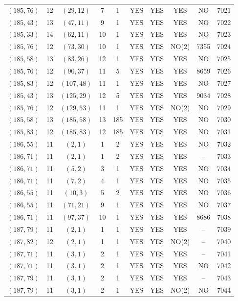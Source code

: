 \begin{longtable}{|c|c|c|c|c|c|c|c|c|c|}
$(185, 76)$ & 12 & $(29, 12)$ & 7 & 1 & YES & YES & YES & NO & 7021\\
$(185, 43)$ & 13 & $(47, 11)$ & 9 & 1 & YES & YES & YES & NO & 7022\\
$(185, 33)$ & 14 & $(62, 11)$ & 10 & 1 & YES & YES & YES & NO & 7023\\
$(185, 76)$ & 12 & $(73, 30)$ & 10 & 1 & YES & YES & NO(2) & 7355 & 7024\\
$(185, 58)$ & 13 & $(83, 26)$ & 12 & 1 & YES & YES & YES & NO & 7025\\
$(185, 76)$ & 12 & $(90, 37)$ & 11 & 5 & YES & YES & YES & 8659 & 7026\\
$(185, 83)$ & 12 & $(107, 48)$ & 11 & 1 & YES & YES & YES & NO & 7027\\
$(185, 43)$ & 13 & $(125, 29)$ & 12 & 5 & YES & YES & YES & 9034 & 7028\\
$(185, 76)$ & 12 & $(129, 53)$ & 11 & 1 & YES & YES & NO(2) & NO & 7029\\
$(185, 58)$ & 13 & $(185, 58)$ & 13 & 185 & YES & YES & YES & NO & 7030\\
$(185, 83)$ & 12 & $(185, 83)$ & 12 & 185 & YES & YES & YES & NO & 7031\\
$(186, 55)$ & 11 & $(2, 1)$ & 1 & 2 & YES & YES & YES & NO & 7032\\
$(186, 71)$ & 11 & $(2, 1)$ & 1 & 2 & YES & YES & YES & -- & 7033\\
$(186, 71)$ & 11 & $(5, 2)$ & 3 & 1 & YES & YES & YES & NO & 7034\\
$(186, 71)$ & 11 & $(7, 2)$ & 4 & 1 & YES & YES & YES & NO & 7035\\
$(186, 55)$ & 11 & $(10, 3)$ & 5 & 2 & YES & YES & YES & NO & 7036\\
$(186, 55)$ & 11 & $(71, 21)$ & 9 & 1 & YES & YES & YES & NO & 7037\\
$(186, 71)$ & 11 & $(97, 37)$ & 10 & 1 & YES & YES & YES & 8686 & 7038\\
$(187, 79)$ & 11 & $(2, 1)$ & 1 & 1 & YES & YES & YES & -- & 7039\\
$(187, 82)$ & 12 & $(2, 1)$ & 1 & 1 & YES & YES & NO(2) & -- & 7040\\
$(187, 71)$ & 11 & $(3, 1)$ & 2 & 1 & YES & YES & YES & -- & 7041\\
$(187, 71)$ & 11 & $(3, 1)$ & 2 & 1 & YES & YES & YES & NO & 7042\\
$(187, 79)$ & 11 & $(3, 1)$ & 2 & 1 & YES & YES & YES & -- & 7043\\
$(187, 79)$ & 11 & $(3, 1)$ & 2 & 1 & YES & YES & NO(2) & NO & 7044\\

\end{longtable}
